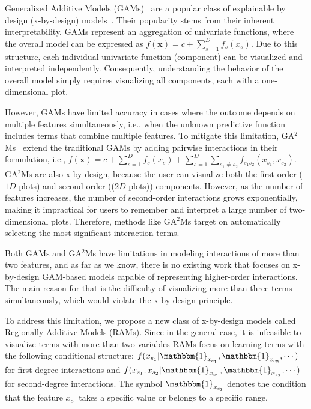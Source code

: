 \documentclass[runningheads]{llncs}
\newcommand{\xb}{\mathbf{x}}
\newcommand{\when}[1]{\mathbbm{1}_{#1}}
\begin{document}
Generalized Additive Models (GAMs)~\citep{hastie1987generalized} are a popular class of explainable by design
(x-by-design) models~\citep{rudin2019stop, ghassemi2021false}.
Their popularity stems from their inherent interpretability.
GAMs represent an aggregation of univariate functions, where the overall model can be expressed as
\(f(\xb) = c + \sum_{s=1}^D f_s(x_s)\).
Due to this structure, each individual univariate function (component) can be visualized and interpreted independently.
Consequently, understanding the behavior of the overall model simply requires visualizing all components, each with a one-dimensional plot.

However, GAMs have limited accuracy in cases where the outcome depends on multiple features simultaneously,
i.e., when the unknown predictive function includes terms that combine multiple features.
To mitigate this limitation, GA$^2$Ms~\citep{lou2013accurate} extend the traditional GAMs by adding pairwise interactions in their
    formulation, i.e., \(f(\xb) = c + \sum_{s=1}^D f_s(x_s) + \sum_{s=1}^D \sum_{s_1 \neq s_2} f_{s_1 s_2}(x_{s_1}, x_{s_2})\).
GA$^2$Ms are also x-by-design, because the user can visualize both the first-order ($1D$ plots) and
second-order (($2D$ plots)) components.
However, as the number of features increases, the number of second-order interactions grows exponentially,
making it impractical for users to remember and interpret a large number of two-dimensional plots.
Therefore, methods like GA$^2$Ms target on automatically selecting the most significant interaction terms.

Both GAMs and GA$^2$Ms have limitations in modeling interactions of more than two features,
and as far as we know, there is no existing work that focuses on x-by-design GAM-based models capable of
representing higher-order interactions.
The main reason for that is the difficulty of visualizing more than three terms simultaneously,
which would violate the x-by-design principle.

To address this limitation, we propose a new class of x-by-design models called Regionally Additive Models (RAMs).
Since in the general case, it is infeasible to visualize terms with more than two variables
RAMs focus on learning terms with the following conditional structure:
$f(x_{s_1} | \when{x_{c_1}}, \when{x_{c_2}}, \cdots)$ for first-degree interactions and
$f(x_{s_1}, x_{s_2} | \when{x_{c_1}}, \when{x_{c_2}}, \cdots)$ for second-degree interactions.
The symbol $\when{x_{c_1}}$ denotes the condition that the feature $x_{c_1}$ takes a specific value or belongs to a specific range.
\end{document}
